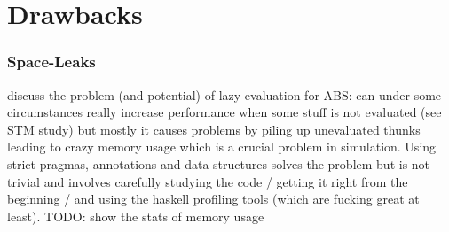 \chapter{Drawbacks}

\subsection{Space-Leaks}
discuss the problem (and potential) of lazy evaluation for ABS: can under some circumstances really increase performance when some stuff is not evaluated (see STM study) but mostly it causes problems by piling up unevaluated thunks leading to crazy memory usage which is a crucial problem in simulation. Using strict pragmas, annotations and data-structures solves the problem but is not trivial and involves carefully studying the code / getting it right from the beginning / and using the haskell profiling tools (which are fucking great at least). TODO: show the stats of memory usage
